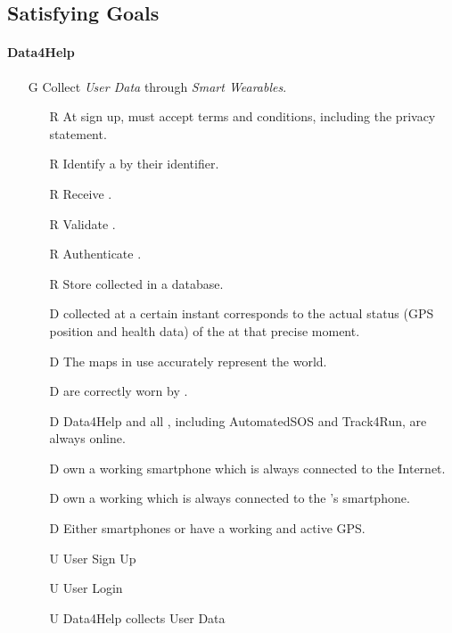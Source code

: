 \documentclass[../../../rasd.tex]{subfiles}
\begin{document}
\subsection{Satisfying Goals}
\paragraph{Data4Help}
\begin{itemize}

    \item[G\subs{1}]Collect \textit{User Data} through \textit{Smart Wearables}.
    \begin{itemize}
        \item[R\subs{4}]At sign up,  must accept terms and conditions, including the privacy statement.
        \item[R\subs{6}]Identify a  by their identifier.
        \item[R\subs{8}]Receive .
        \item[R\subs{9}]Validate .
        \item[R\subs{10}]Authenticate .
        \item[R\subs{11}]Store collected  in a database.
        \\
        \item[D\subs{2}] collected at a certain instant corresponds to the actual status (GPS position and health data) of the  at that precise moment.              
        \item[D\subs{3}]The maps in use accurately represent the world.
        \item[D\subs{8}] are correctly worn by .
        \item[D\subs{9}]Data4Help and all , including AutomatedSOS and Track4Run, are always online.
        \item[D\subs{10}] own a working smartphone which is always connected to the Internet.
        \item[D\subs{11}] own a working  which is always connected to the 's smartphone.
        \item[D\subs{12}]Either smartphones or  have a working and active GPS.
        \\
        \item[U\subs{1}]User Sign Up
        \item[U\subs{3}]User Login
        \item[U\subs{5}]Data4Help collects User Data


\end{itemize}
\end{itemize}
\end{document}
